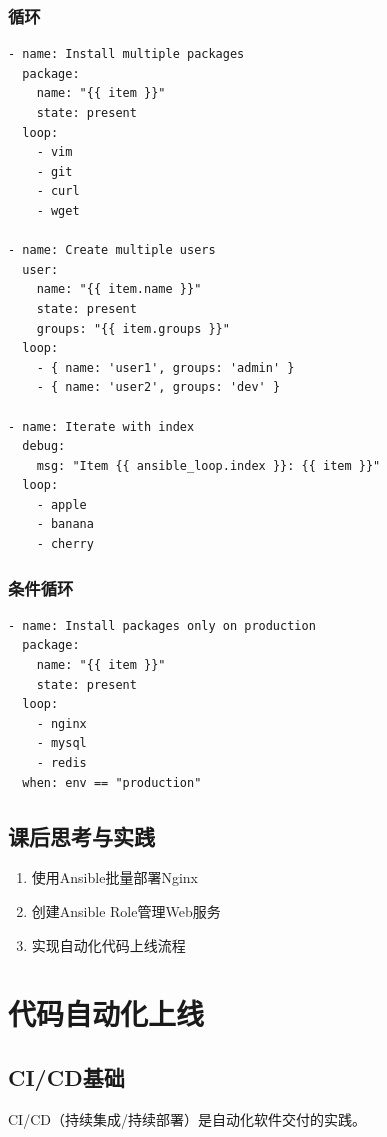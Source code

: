 \documentclass[12pt,UTF8]{ctexbook}
\begin{document}
\subsection*{循环}
\begin{lstlisting}
- name: Install multiple packages
  package:
    name: "{{ item }}"
    state: present
  loop:
    - vim
    - git
    - curl
    - wget

- name: Create multiple users
  user:
    name: "{{ item.name }}"
    state: present
    groups: "{{ item.groups }}"
  loop:
    - { name: 'user1', groups: 'admin' }
    - { name: 'user2', groups: 'dev' }

- name: Iterate with index
  debug:
    msg: "Item {{ ansible_loop.index }}: {{ item }}"
  loop:
    - apple
    - banana
    - cherry
\end{lstlisting}

\subsection*{条件循环}
\begin{lstlisting}
- name: Install packages only on production
  package:
    name: "{{ item }}"
    state: present
  loop:
    - nginx
    - mysql
    - redis
  when: env == "production"
\end{lstlisting}

\section{课后思考与实践}
\label{sec:ansible-practice}
\begin{enumerate}
    \item 使用Ansible批量部署Nginx
    \item 创建Ansible Role管理Web服务
    \item 实现自动化代码上线流程
\end{enumerate}

\chapter{代码自动化上线}
\label{chap:code-deployment}

\section{CI/CD基础}
\label{sec:cicd-basics}

CI/CD（持续集成/持续部署）是自动化软件交付的实践。
\end{document}
